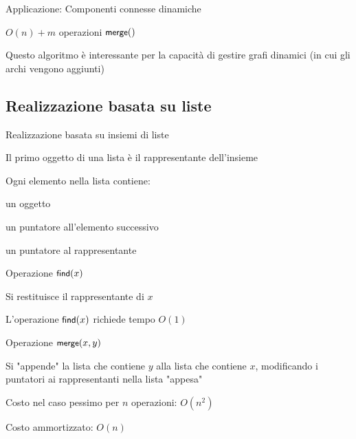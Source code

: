 \begin{frame}{Applicazione: Componenti connesse dinamiche}

\vspace{-9pt}
\begin{myboxtitle}[Complessità]
\smallskip
$O(n) + m$ operazioni $\textsf{{\small merge}}()$
\end{myboxtitle}

\begin{myboxtitle}[Motivazione]
\smallskip
Questo algoritmo è interessante per la capacità di gestire grafi dinamici 
(in cui gli archi vengono aggiunti)
\end{myboxtitle}

\end{frame}

\subsection{Realizzazione basata su liste}


\begin{frame}{Realizzazione basata su insiemi di liste}

\vspace{-9pt}
\BIL
\item Il primo oggetto di una lista è il rappresentante dell'insieme
\item Ogni elemento nella lista contiene:
  \BI
  \item un oggetto
  \item un puntatore all'elemento successivo
  \item un puntatore al rappresentante
  \EI
\EIL


\end{frame}

\begin{frame}{Operazione $\textsf{{\small find}}(x)$}

\vspace{-9pt}
\BIL
\item Si restituisce il rappresentante di $x$
\item L'operazione $\textsf{{\small find}}(x)$ richiede tempo $O(1)$
\EIL

\bigskip
{}

\end{frame}


\begin{frame}{Operazione $\textsf{{\small merge}}(x,y)$}

\vspace{-9pt}
\BIL
\item Si "appende" la lista che contiene $y$ alla lista che contiene $x$, modificando
i puntatori ai rappresentanti nella lista "appesa"
\item Costo nel caso pessimo per $n$ operazioni: $O(n^2)$
\item Costo ammortizzato: $O(n)$
\EIL


\end{frame}

